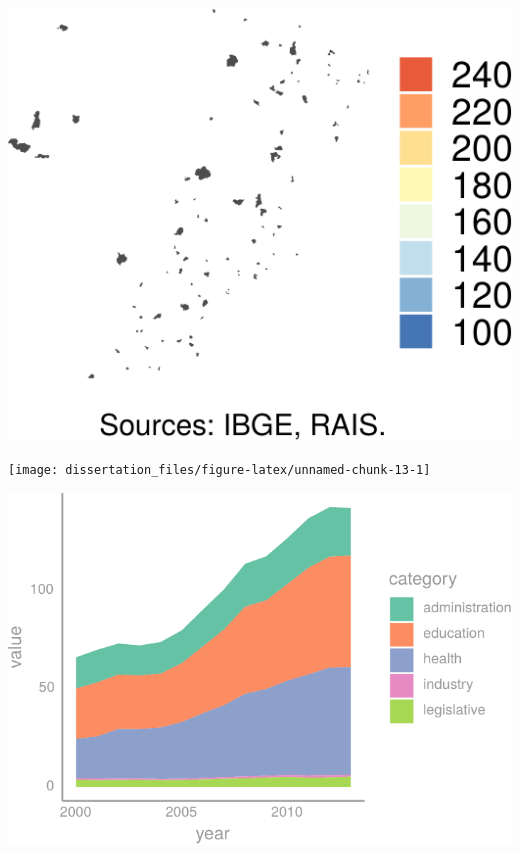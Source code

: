 \documentclass[12pt,]{article}
\begin{document}
\begin{center}\includegraphics{dissertation_files/figure-latex/unnamed-chunk-12-1} \end{center}

\begin{center}\texttt{[image: dissertation\_files/figure-latex/unnamed-chunk-13-1]} \end{center}

\begin{center}\includegraphics{dissertation_files/figure-latex/unnamed-chunk-14-1} \end{center}
\end{document}

